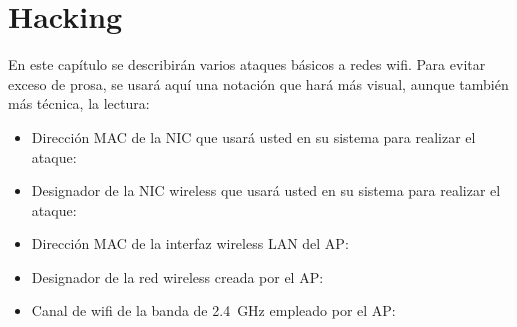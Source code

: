 \chapter{Hacking}\label{chapter:hacking}
En este capítulo se describirán varios ataques básicos a redes wifi. Para evitar exceso de prosa, se usará aquí
una notación que hará más visual, aunque también más técnica, la lectura:

\begin{itemize}
  \item Dirección MAC de la NIC que usará usted en su sistema para realizar el ataque: 
  \item Designador de la NIC wireless que usará usted en su sistema para realizar el ataque: 
  \item Dirección MAC de la interfaz wireless LAN del AP: 
  \item Designador de la red wireless creada por el AP: 
  \item Canal de wifi de la banda de \SI{2.4}{\giga\hertz} empleado por el AP: 
\end{itemize}





